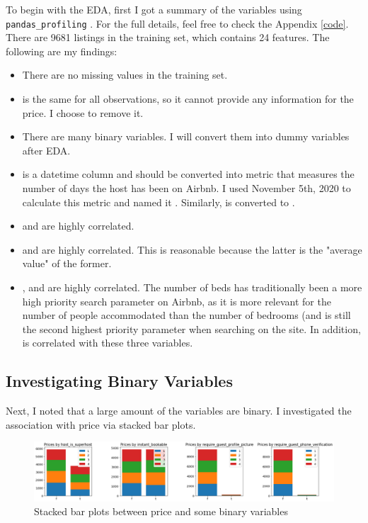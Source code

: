 \documentclass[11pt]{article}
\begin{document}
To begin with the EDA, first I got a summary of the variables using \texttt{pandas\_profiling}
\cite{pandasprofiling2019} . For the full details, feel free to check the Appendix \ref{code}. There are 9681 listings in the training set, which contains 24 features. The following are my findings:
\begin{itemize}
    \item There are no missing values in the training set.
    \item {} is the same for all observations, so it cannot provide any information for the price. I choose to remove it. 
    \item There are many binary variables. I will convert them into dummy variables after EDA.
    \item {} is a datetime column and should be converted into metric that measures the number of days the host has been on Airbnb. I used November 5th, 2020 to calculate this metric and named it . Similarly,  is converted to .
    \item {} and  are highly correlated.
    \item {} and  are highly correlated. This is reasonable because the latter is the "average value" of the former.
    \item {},  and  are highly correlated. The number of beds has traditionally been a more high priority search parameter on Airbnb, as it is more relevant for the number of people accommodated than the number of bedrooms (and is still the second highest priority parameter when searching on the site. In addition,  is correlated with these three variables.
\end{itemize}

\subsection{Investigating Binary Variables}
Next, I noted that a large amount of the variables are binary. I investigated the association with price via stacked bar plots. 
\begin{figure}[h]
    \caption{Stacked bar plots between price and some binary variables}
    \label{binary}
    \centering
    \includegraphics[width=1.15\textwidth]{../img/binary.png}
\end{figure}
\end{document}
